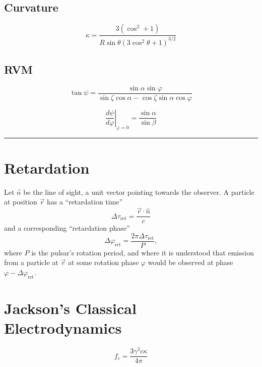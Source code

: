 \documentclass[twocolumn]{article}
\newcommand{\phase}{\varphi}
\begin{document}
\subsection{Curvature}

\begin{equation}
    \kappa = \frac{3(\cos^2 + 1)}{R\sin\theta(3\cos^2\theta + 1)^{3/2}}
\end{equation}

\subsection{RVM}

\begin{equation}
    \tan{\psi} = \frac{\sin\alpha \sin\phase}{\sin\zeta\cos\alpha - \cos\zeta\sin\alpha\cos\phase}
\end{equation}

\begin{equation}
    \left.\frac{d\psi}{d\phase}\right|_{\phase=0} = \frac{\sin\alpha}{\sin\beta}
\end{equation}

\rule{\columnwidth}{1pt}

\section{Retardation}

Let $\hat{n}$ be the line of sight, a unit vector pointing towards the observer.
A particle at position $\vec{r}$ has a ``retardation time''
\begin{equation}
    \Delta\tau_\text{ret} = \frac{\vec{r}\cdot\hat{n}}{c}
\end{equation}
and a corresponding ``retardation phase''
\begin{equation}
    \Delta\phase_\text{ret} = \frac{2\pi\Delta\tau_\text{ret}}{P},
\end{equation}
where $P$ is the pulsar's rotation period, and where it is understood that emission from a particle at $\vec{r}$ at some rotation phase $\phase$ would be observed at phase $\phase - \Delta\phase_\text{ret}$.

\section{Jackson's Classical Electrodynamics}

\begin{equation}
    f_c = \frac{3\gamma^3 c\kappa}{4\pi}
    \tag{J14.81}
\end{equation}
\end{document}
